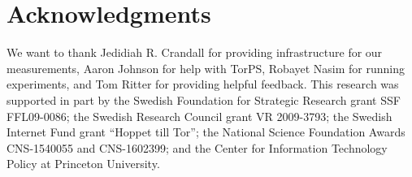 \section*{Acknowledgments}
We want to thank Jedidiah R. Crandall for providing infrastructure for our
measurements, Aaron Johnson for help with TorPS, Robayet Nasim for running
\name experiments, and Tom Ritter for providing
helpful feedback.
%
This research was supported in part by the Swedish Foundation for Strategic
Research grant SSF FFL09-0086; the Swedish Research Council grant VR 2009-3793;
the Swedish Internet Fund grant ``Hoppet till Tor''; the National Science
Foundation Awards CNS-1540055 and CNS-1602399; and the Center for Information
Technology Policy at Princeton University.
